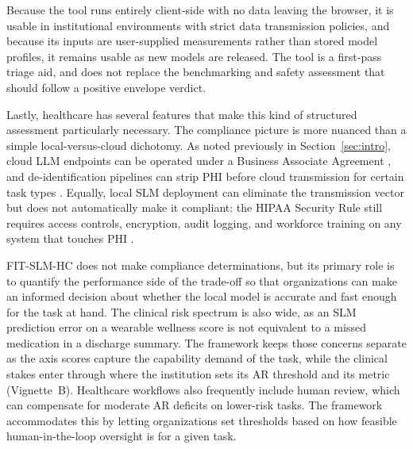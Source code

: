 \documentclass[11pt]{article}
\begin{document}
Because the tool runs entirely client-side with no data leaving the browser, it is usable in institutional environments with strict data transmission policies, and because its inputs are user-supplied measurements rather than stored model profiles, it remains usable as new models are released. The tool is a first-pass triage aid, and does not replace the benchmarking and safety assessment that should follow a positive envelope verdict.

Lastly, healthcare has several features that make this kind of structured assessment particularly necessary. The compliance picture is more nuanced than a simple local-versus-cloud dichotomy. As noted previously in Section~\ref{sec:intro}, cloud LLM endpoints can be operated under a Business Associate Agreement \cite{HHSBAA, Marks2023HIPAAAI}, and de-identification pipelines can strip PHI before cloud transmission for certain task types \cite{Kovacevic2024DeID}. Equally, local SLM deployment can eliminate the transmission vector but does not automatically make it compliant: the HIPAA Security Rule still requires access controls, encryption, audit logging, and workforce training on any system that touches PHI \cite{HHS2013SecurityRule}.

FIT-SLM-HC does not make compliance determinations, but its primary role is to quantify the performance side of the trade-off so that organizations can make an informed decision about whether the local model is accurate and fast enough for the task at hand. The clinical risk spectrum is also wide, as an SLM prediction error on a wearable wellness score is not equivalent to a missed medication in a discharge summary. The framework keeps those concerns separate as the axis scores capture the capability demand of the task, while the clinical stakes enter through where the institution sets its AR threshold and its metric (Vignette~B). Healthcare workflows also frequently include human review, which can compensate for moderate AR deficits on lower-risk tasks. The framework accommodates this by letting organizations set thresholds based on how feasible human-in-the-loop oversight is for a given task.
\end{document}

